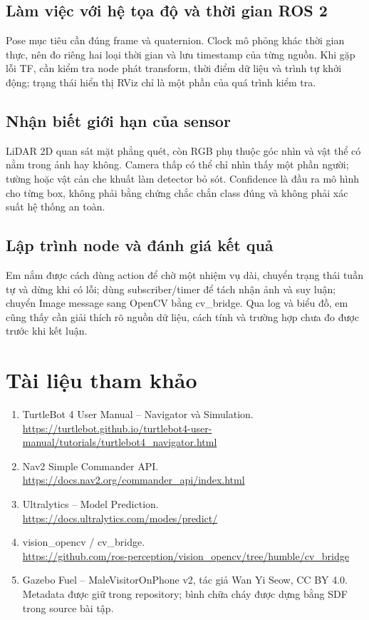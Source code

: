 \documentclass[a4paper,11pt]{article}
\begin{document}
\subsection{Làm việc với hệ tọa độ và thời gian ROS 2}

Pose mục tiêu cần đúng frame và quaternion. Clock mô phỏng khác thời gian thực,
nên đo riêng hai loại thời gian và lưu timestamp của từng nguồn. Khi gặp lỗi TF,
cần kiểm tra node phát transform, thời điểm dữ liệu và trình tự khởi động; trạng thái
hiển thị RViz chỉ là một phần của quá trình kiểm tra.

\subsection{Nhận biết giới hạn của sensor}

LiDAR 2D quan sát mặt phẳng quét, còn RGB phụ thuộc góc nhìn và vật thể có nằm
trong ảnh hay không. Camera thấp có thể chỉ nhìn thấy một phần người; tường hoặc
vật cản che khuất làm detector bỏ sót. Confidence là đầu ra mô hình cho từng box,
không phải bằng chứng chắc chắn class đúng và không phải xác suất hệ thống an toàn.

\subsection{Lập trình node và đánh giá kết quả}

Em nắm được cách dùng action để chờ một nhiệm vụ dài, chuyển trạng thái tuần tự
và dừng khi có lỗi; dùng subscriber/timer để tách nhận ảnh và suy luận; chuyển
Image message sang OpenCV bằng cv\_bridge. Qua log và biểu đồ, em cũng thấy cần
giải thích rõ nguồn dữ liệu, cách tính và trường hợp chưa đo được trước khi kết luận.

\section*{Tài liệu tham khảo}
\begin{enumerate}
\item TurtleBot 4 User Manual -- Navigator và Simulation.\\
\url{https://turtlebot.github.io/turtlebot4-user-manual/tutorials/turtlebot4_navigator.html}
\item Nav2 Simple Commander API.\\\url{https://docs.nav2.org/commander_api/index.html}
\item Ultralytics -- Model Prediction.\\\url{https://docs.ultralytics.com/modes/predict/}
\item vision\_opencv / cv\_bridge.\\\url{https://github.com/ros-perception/vision_opencv/tree/humble/cv_bridge}
\item Gazebo Fuel -- MaleVisitorOnPhone v2, tác giả Wan Yi Seow, CC BY 4.0. Metadata được giữ trong repository; bình chữa cháy được dựng bằng SDF trong source bài tập.
\end{enumerate}
\end{document}
